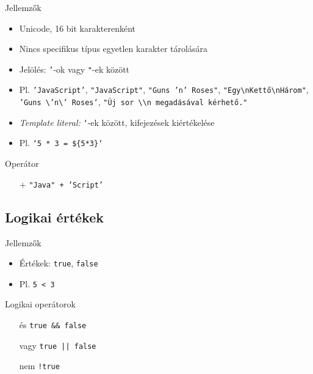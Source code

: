 \begin{frame}
    Jellemzők
    \begin{itemize}
        \item Unicode, 16 bit karakterenként
        \item Nincs specifikus típus egyetlen karakter tárolására
        \item Jelölés: \texttt{'}-ok vagy \texttt{"}-ek között
        \item Pl. \texttt{'JavaScript'}, \texttt{"JavaScript"}, \texttt{"Guns 'n' Roses"}, \texttt{"Egy\textbackslash nKettő\textbackslash nHárom"}, \texttt{'Guns \textbackslash 'n\textbackslash' Roses'}, \texttt{"Új sor \textbackslash\textbackslash n megadásával kérhető."}
        \item \emph{Template literal:} \texttt{`}-ek között, kifejezések kiértékelése
        \item Pl. \texttt{`5 * 3 = \$\{5*3\}`} 
    \end{itemize}
    \vfill
    Operátor
    \begin{itemize}
        \item[$+$] \texttt{"Java" + 'Script'} 
    \end{itemize}
\end{frame}

\subsection{Logikai értékek}

\begin{frame}
    Jellemzők
    \begin{itemize}
        \item Értékek: \texttt{true}, \texttt{false}
        \item Pl. \texttt{5 < 3} 
    \end{itemize}
    \vfill
    Logikai operátorok
    \begin{itemize}
        \item[és] \texttt{true \&\& false} 
        \item[vagy] \texttt{true || false} 
        \item[nem] \texttt{!true} 
    \end{itemize}
\end{frame}

